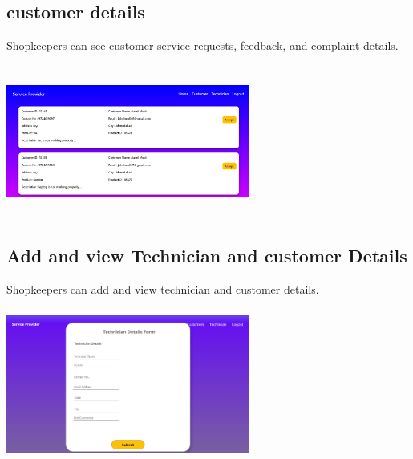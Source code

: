 \documentclass[conference]{IEEEtran}
\begin{document}
\subsection{customer details}
Shopkeepers can see customer service requests, feedback, and complaint details.
\graphicspath{ {./details/} }
\includegraphics[width=8cm , height=5cm]{details}

\subsection{Add and view Technician and customer Details}
Shopkeepers can add and view technician and customer details.
\graphicspath{ {./viewtech/} }
\includegraphics[width=8cm , height=5cm]{viewtech}
\end{document}

